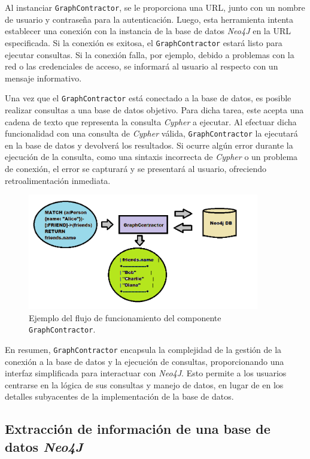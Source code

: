 Al instanciar \texttt{GraphContractor}, se le proporciona una URL, junto con un nombre de usuario y contraseña para la autenticación. Luego, esta herramienta intenta establecer una conexión con la instancia de la base de datos \textit{Neo4J} en la URL especificada. Si la conexión es exitosa, el \texttt{GraphContractor} estará listo para ejecutar consultas. Si la conexión falla, por ejemplo, debido a problemas con la red o las credenciales de acceso, se informará al usuario al respecto con un mensaje informativo.

Una vez que el \texttt{GraphContractor} está conectado a la base de datos, es posible realizar consultas a una base de datos objetivo. Para dicha tarea, este acepta una cadena de texto que representa la consulta \textit{Cypher} a ejecutar. Al efectuar dicha funcionalidad con una consulta de \textit{Cypher} válida, \texttt{GraphContractor} la ejecutará en la base de datos y devolverá los resultados. Si ocurre algún error durante la ejecución de la consulta, como una sintaxis incorrecta de \textit{Cypher} o un problema de conexión, el error se capturará y se presentará al usuario, ofreciendo retroalimentación inmediata.

\begin{figure}[H]\label{gcimage}
	\centering
	\includegraphics[width = 0.9\textwidth]{./Graphics/graph_contractor}
	\caption{Ejemplo del flujo de funcionamiento del componente \texttt{GraphContractor}.}
\end{figure}

En resumen, \texttt{GraphContractor} encapsula la complejidad de la gestión de la conexión a la base de datos y la ejecución de consultas, proporcionando una interfaz simplificada para interactuar con \textit{Neo4J}. Esto permite a los usuarios centrarse en la lógica de sus consultas y manejo de datos, en lugar de en los detalles subyacentes de la implementación de la base de datos.

\subsection{Extracción de información de una base de datos \textit{Neo4J}} \label{knowledge_base}

